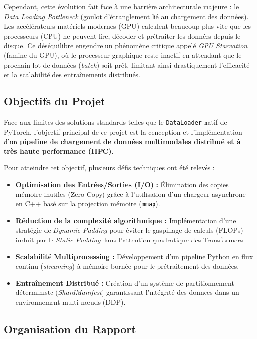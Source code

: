 \documentclass[12pt,a4paper]{report}
\begin{document}
Cependant, cette évolution fait face à une barrière architecturale majeure : le \textit{Data Loading Bottleneck} (goulot d'étranglement lié au chargement des données). Les accélérateurs matériels modernes (GPU) calculent beaucoup plus vite que les processeurs (CPU) ne peuvent lire, décoder et prétraiter les données depuis le disque. Ce déséquilibre engendre un phénomène critique appelé \textit{GPU Starvation} (famine du GPU), où le processeur graphique reste inactif en attendant que le prochain lot de données (\textit{batch}) soit prêt, limitant ainsi drastiquement l'efficacité et la scalabilité des entraînements distribués.

\subsection{Objectifs du Projet}

Face aux limites des solutions standards telles que le \texttt{DataLoader} natif de PyTorch, l'objectif principal de ce projet est la conception et l'implémentation d'un \textbf{pipeline de chargement de données multimodales distribué et à très haute performance (HPC)}. 

Pour atteindre cet objectif, plusieurs défis techniques ont été relevés :
\begin{itemize}
  \item \textbf{Optimisation des Entrées/Sorties (I/O) :} Élimination des copies mémoire inutiles (Zero-Copy) grâce à l'utilisation d'un chargeur asynchrone en C++ basé sur la projection mémoire (\texttt{mmap}).
  \item \textbf{Réduction de la complexité algorithmique :} Implémentation d'une stratégie de \textit{Dynamic Padding} pour éviter le gaspillage de calculs (FLOPs) induit par le \textit{Static Padding} dans l'attention quadratique des Transformers.
  \item \textbf{Scalabilité Multiprocessing :} Développement d'un pipeline Python en flux continu (\textit{streaming}) à mémoire bornée pour le prétraitement des données.
  \item \textbf{Entraînement Distribué :} Création d'un système de partitionnement déterministe (\textit{ShardManifest}) garantissant l'intégrité des données dans un environnement multi-nœuds (DDP).
\end{itemize}

\subsection{Organisation du Rapport}
\end{document}
